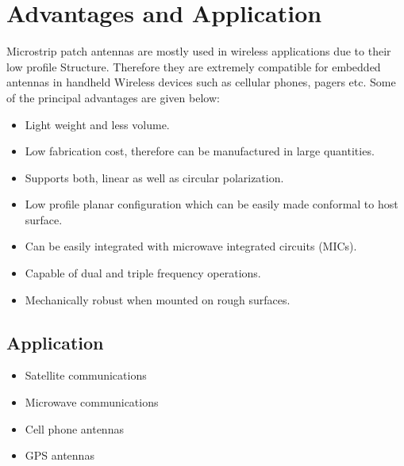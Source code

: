 \documentclass[12pt]{article}
\begin{document}
					                 \section{Advantages and Application}
					                  \justify
						                 Microstrip patch antennas are mostly used in wireless applications due to their low profile Structure. Therefore they are extremely compatible for embedded antennas in handheld Wireless devices such as cellular phones, pagers etc.
						                 Some of the principal advantages are given below:
						                 \begin{itemize}
						                 	\item Light weight and less volume.
						                 	\item Low fabrication cost, therefore can be manufactured in large quantities.
						                 	\item Supports both, linear as well as circular polarization.
						                 	\item Low profile planar configuration which can be easily made conformal to host surface.
						                 	\item Can be easily integrated with microwave integrated circuits (MICs).	
						                 	\item Capable of dual and triple frequency operations.
						                 	\item Mechanically robust when mounted on rough surfaces.
						                 \end{itemize}
						                
						                 
						                 \subsection{Application}
						                 \begin{itemize}
						                 	\item Satellite communications
						                 	\item Microwave communications
						                 	\item Cell phone antennas
						                 	\item GPS antennas
						                 	
						                 \end{itemize}
						    
						              
					               	
\end{document}
